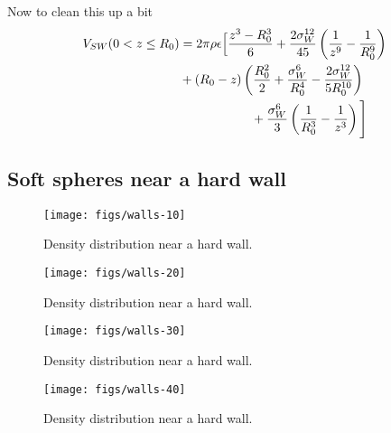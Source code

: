 \documentclass[letterpaper,twocolumn,amsmath,amssymb,prb]{revtex4-1}
\begin{document}
Now to clean this up a bit
\begin{align}
V_{SW}(0 < z \leq R_0) &= 2\pi\rho\epsilon\Big[ \frac{z^3-R_0^3}{6} +
  \frac{2\sigma_W^{12}}{45} \left(\frac{1}{z^9}-\frac{1}{R_0^9}\right)
  \notag \\
  &+ \left( R_0 - z \right)\left(\frac{R_0^2}{2} +
  \frac{\sigma_W^6}{R_0^4} - \frac{2\sigma_W^{12}}{5R_0^{10}}\right)
  \notag \\
  &\hspace{2cm}+\frac{\sigma_W^6}{3}\left(\frac{1}{R_0^3}-\frac{1}{z^3}
  \right) \Bigg]
\end{align}

\subsection{Soft spheres near a hard wall}

\begin{figure}
\begin{center}
\texttt{[image: figs/walls-10]}
\end{center}
\caption{Density distribution near a hard wall.}
\label{fig:walls-10}
\end{figure}

\begin{figure}
\begin{center}
\texttt{[image: figs/walls-20]}
\end{center}
\caption{Density distribution near a hard wall.}
\label{fig:walls-20}
\end{figure}

\begin{figure}
\begin{center}
\texttt{[image: figs/walls-30]}
\end{center}
\caption{Density distribution near a hard wall.}
\label{fig:walls-30}
\end{figure}

\begin{figure}
\begin{center}
\texttt{[image: figs/walls-40]}
\end{center}
\caption{Density distribution near a hard wall.}
\label{fig:walls-40}
\end{figure}

\end{document}
